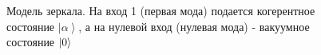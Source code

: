 \begin{figure}
\centering



\caption{Модель зеркала. На вход 1 (первая мода) подается 
когерентное состояние $\left|\alpha\right>$, а на нулевой вход
(нулевая мода) - вакуумное состояние $\ket{0}$}
\label{figPart2Interfero_3}
\end{figure}
